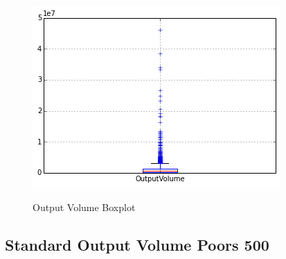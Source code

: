 \begin{figure}[bth]
  \myfloatalign
  {\includegraphics[width=1\linewidth]
    {gfx/output-volume-boxplot}}
  \caption{Output Volume
    Boxplot}
  \label{fig:output-volume-boxplot}
\end{figure}

\clearpage

\subsection{Standard Output Volume Poors 500}
\label{sec:standard-and-poors-500}

